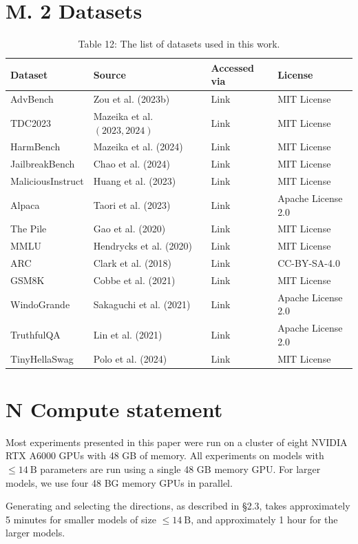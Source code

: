 \documentclass[10pt]{article}
\begin{document}
\section*{M. 2 Datasets}
\begin{table}[h]
\begin{center}
\captionsetup{labelformat=empty}
\caption{Table 12: The list of datasets used in this work.}
\begin{tabular}{|l|l|l|l|}
\hline
Dataset & Source & Accessed via & License \\
\hline
AdvBench & Zou et al. (2023b) & Link & MIT License \\
\hline
TDC2023 & Mazeika et al. $(2023,2024)$ & Link & MIT License \\
\hline
HarmBench & Mazeika et al. (2024) & Link & MIT License \\
\hline
JailbreakBench & Chao et al. (2024) & Link & MIT License \\
\hline
MaliciousInstruct & Huang et al. (2023) & Link & MIT License \\
\hline
Alpaca & Taori et al. (2023) & Link & Apache License 2.0 \\
\hline
The Pile & Gao et al. (2020) & Link & MIT License \\
\hline
MMLU & Hendrycks et al. (2020) & Link & MIT License \\
\hline
ARC & Clark et al. (2018) & Link & CC-BY-SA-4.0 \\
\hline
GSM8K & Cobbe et al. (2021) & Link & MIT License \\
\hline
WindoGrande & Sakaguchi et al. (2021) & Link & Apache License 2.0 \\
\hline
TruthfulQA & Lin et al. (2021) & Link & Apache License 2.0 \\
\hline
TinyHellaSwag & Polo et al. (2024) & Link & MIT License \\
\hline
\end{tabular}
\end{center}
\end{table}

\section*{N Compute statement}
Most experiments presented in this paper were run on a cluster of eight NVIDIA RTX A6000 GPUs with 48 GB of memory. All experiments on models with $\leq 14 \mathrm{~B}$ parameters are run using a single 48 GB memory GPU. For larger models, we use four 48 BG memory GPUs in parallel.

Generating and selecting the directions, as described in §2.3, takes approximately 5 minutes for smaller models of size $\leq 14 \mathrm{~B}$, and approximately 1 hour for the larger models.
\end{document}
